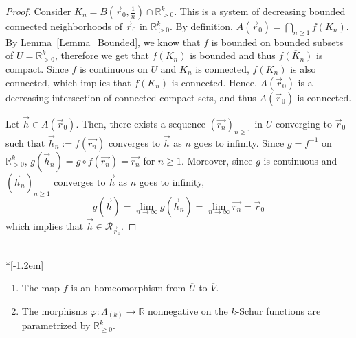 \documentclass[ALCO,ThmDefs,Unicode,epreuves]{cedram}
\begin{document}
\begin{proof}
Consider $K_{n}=B\left( \vec{r}_{0},\frac{1}{n}\right) \cap\mathbb{R}%
_{>0}^{k}$. This is a system of decreasing bounded connected neighborhoods of
$\vec{r}_{0}$ in $\mathbb{R}_{>0}^{k}$. By definition, $A(\vec{r}_{0}%
)=\bigcap_{n\geq1}\overline{f(K_{n})}$. By Lemma~\ref{Lemma_Bounded}, we know
that $f$ is bounded on bounded subsets of $U=\mathbb{R}_{>0}^{k}$, therefore
we get that $f(K_{n})$ is bounded and thus $\overline{f(K_{n})}$ is compact.
Since $f$ is continuous on $U$ and $K_{n}$ is connected, $f(K_{n})$ is also
connected, which implies that $\overline{f(K_{n})}$ is connected. Hence,
$A(\vec{r}_{0})$ is a decreasing intersection of connected compact sets, and
thus $A(\vec{r}_{0})$ is connected.

Let $\vec{h}\in A(\vec{r}_{0})$. Then, there exists a sequence $(\vec
{r_{n}})_{n\geq1}$ in $U$ converging to $\vec{r}_{0}$ such that $\vec{h}%
_{n}:=f(\vec{r_{n}})$ converges to $\vec{h}$ as $n$ goes to infinity. Since $g=f^{-1}$ on $\mathbb{R}_{>0}^{k}$, $g(\vec{h}_{n})=g\circ f(\vec
{r_{n}})=\vec{r_{n}}$ for $n\geq1$. Moreover, since $g$ is continuous and
$(\vec{h}_{n})_{n\geq1}$ converges to $\vec{h}$ as $n$ goes to infinity,
\[
g(\vec{h})=\lim_{n\rightarrow\infty}g(\vec{h}_{n})=\lim_{n\rightarrow\infty
}\vec{r_{n}}=\vec{r}_{0}%
\]
which implies that $\vec{h}\in\mathcal{R}_{\vec{r}_{0}}$.
\end{proof}

\begin{theorem}\label{Th_UVhomeo}\ \\*[-1.2em]

\begin{enumerate}
\item\label{theo5.6_1} The map $f$ is an homeomorphism from $\overline{U}$ to $\overline{V}$.

\item\label{theo5.6_2} The morphisms $\varphi:\Lambda_{(k)}\rightarrow\mathbb{R}$ nonnegative
on the $k$-Schur functions are parametrized by $\mathbb{R}_{\geq0}^{k}$.
\end{enumerate}
\end{theorem}
\end{document}
